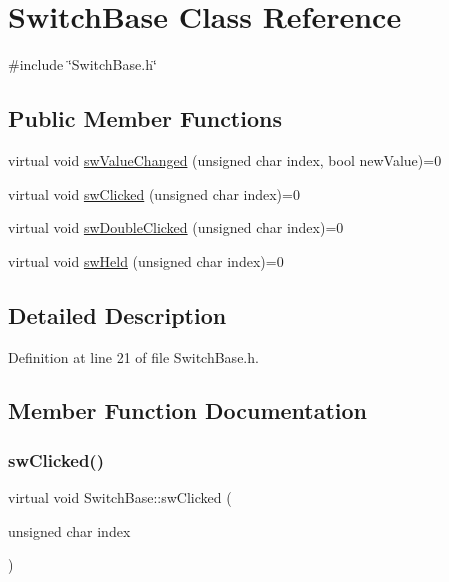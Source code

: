 \hypertarget{class_switch_base}{}\section{Switch\+Base Class Reference}
\label{class_switch_base}


{\ttfamily \#include \char`\"{}Switch\+Base.\+h\char`\"{}}

\subsection*{Public Member Functions}
\begin{DoxyCompactItemize}
\item 
virtual void \hyperlink{class_switch_base_a8dce83329bd9ce69e55d2f01115f3593}{sw\+Value\+Changed} (unsigned char index, bool new\+Value)=0
\item 
virtual void \hyperlink{class_switch_base_aa351081e25dc6a74959c1ec49f972fb5}{sw\+Clicked} (unsigned char index)=0
\item 
virtual void \hyperlink{class_switch_base_a120bac96086b295783809866e3afd390}{sw\+Double\+Clicked} (unsigned char index)=0
\item 
virtual void \hyperlink{class_switch_base_a074fca26f56e9253ddd86720f7840440}{sw\+Held} (unsigned char index)=0
\end{DoxyCompactItemize}


\subsection{Detailed Description}


Definition at line 21 of file Switch\+Base.\+h.



\subsection{Member Function Documentation}
\mbox{\label{class_switch_base_aa351081e25dc6a74959c1ec49f972fb5}} 
\subsubsection{\texorpdfstring{sw\+Clicked()}{swClicked()}}
{\footnotesize\ttfamily virtual void Switch\+Base\+::sw\+Clicked (\begin{DoxyParamCaption}\item[{unsigned char}]{index }\end{DoxyParamCaption})\hspace{0.3cm}{\ttfamily [pure virtual]}}

